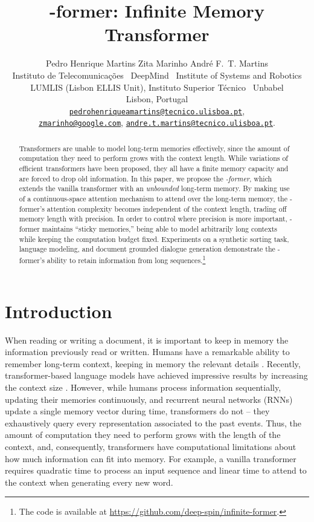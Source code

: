 \documentclass[11pt]{article}
\title{-former: Infinite Memory Transformer}
\author{Pedro Henrique Martins\textsuperscript{\Neptune} \quad
        Zita Marinho\textsuperscript{\Moon\Scorpio} \quad
        Andr\'e F.~T. Martins\textsuperscript{\Neptune\Pluto\Saturn} \\
\textsuperscript{\Neptune}Instituto de Telecomunica\c{c}\~oes~
\textsuperscript{\Moon}DeepMind~
\textsuperscript{\Scorpio}Institute of Systems and Robotics\\
\textsuperscript{\Pluto}LUMLIS (Lisbon ELLIS Unit), Instituto Superior T\'ecnico~
\textsuperscript{\Saturn}Unbabel\\
Lisbon, Portugal\\
\href{mailto:pedrohenriqueamartins@tecnico.ulisboa.pt}{\tt pedrohenriqueamartins@tecnico.ulisboa.pt},\\
\href{mailto:zmarinho@google.com}{\tt zmarinho@google.com}, \quad
\href{mailto:andre.martins@unbabel.com}{\tt andre.t.martins@tecnico.ulisboa.pt}.
}
\begin{document}
\maketitle

\begin{abstract}
Transformers are unable to model long-term memories effectively, since the amount of computation they need to perform grows with the context length. 
While variations of efficient transformers have been proposed, they all have a finite memory capacity and are forced to drop old information. 
In this paper, we propose the  \textit{-former}, which extends the vanilla transformer with an \emph{unbounded} long-term memory. 
By making use of a continuous-space attention mechanism to attend over the long-term memory, the -former's attention complexity becomes independent of the context length, trading off memory length with precision.
In order to control where precision is more important, -former maintains ``sticky memories,'' being able to model arbitrarily long contexts while keeping the computation budget fixed.
Experiments on a synthetic sorting task, language modeling, and document grounded dialogue generation demonstrate the -former's ability to retain information from long sequences.\footnote{The code is available at \url{https://github.com/deep-spin/infinite-former}.}
\end{abstract}

\section{Introduction}
When reading or writing a document, it is important to keep in memory the information previously read or written. Humans have a remarkable ability to remember long-term context, keeping in memory the relevant details \citep{carroll2007psychology,kuhbandner2020long}.
Recently, transformer-based language models have achieved impressive results by increasing the context size \cite{radford2018improving,radford2019language,dai2019transformer,rae2019compressive,brown2020language}. However, while humans process information sequentially, updating their memories continuously, and recurrent neural networks (RNNs) update a single memory vector during time, transformers do not -- they exhaustively query every representation associated to the past events.
Thus, the amount of computation they need to perform grows with the length of the context, and, consequently, transformers have computational limitations about how much information can fit into memory. For example, a vanilla transformer requires quadratic time to process an input sequence and linear time to attend to the context when generating every new word. 
\end{document}

